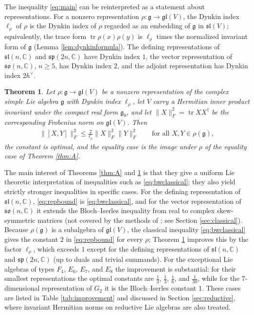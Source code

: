 \documentclass [leqno, 10pt]{amsart}
\newtheorem{theorem}{Theorem}[section]
\theoremstyle{definition}
\numberwithin{equation}{section}
\newcommand{\so}{\mathfrak{so}}
\renewcommand{\sp}{\mathfrak{sp}}
\newcommand{\gl}{\mathfrak{gl}}
\newcommand{\sll}{\mathfrak{sl}}
\newcommand{\g}{\mathfrak{g}}
\newcommand{\com}{\mathbb C}
\newcommand{\tr}{\operatorname{tr}}
\newcommand{\gz}{\g_{0}}
\newcommand{\hv}{h^\vee}
\newcommand{\fnorm}[1]{\lVert #1\rVert_{F}}
\begin{document}
The inequality \eqref{eq:main} can be reinterpreted as a statement about representations. For a nonzero representation $\rho:\g \to \gl(V)$, the Dynkin index $\ell_{\rho}$ of $\rho$ is the Dynkin index of $\rho$ regarded as an embedding of $\g$ in $\sll(V)$; equivalently, the trace form $\tr \rho(x)\rho(y)$ is $\ell_{\rho}$ times the normalized invariant form of $\g$ (Lemma \ref{lem:dynkinformula}). The defining representations of $\sll(n, \com)$ and $\sp(2n, \com)$ have Dynkin index $1$, the vector representation of $\so(n, \com)$, $n \geq 5$, has Dynkin index $2$, and the adjoint representation has Dynkin index $2\hv$.

\begin{theorem}\label{thm:B}
Let $\rho:\g \to \gl(V)$ be a nonzero representation of the complex simple Lie algebra $\g$ with Dynkin index $\ell_{\rho}$, let $V$ carry a Hermitian inner product invariant under the compact real form $\gz$, and let $\fnorm{X}^{2} = \tr XX^{\dagger}$ be the corresponding Frobenius norm on $\gl(V)$. Then
\begin{align}\label{eq:repbound}
\fnorm{[X, Y]}^{2} \leq \frac{2}{\ell_{\rho}}\fnorm{X}^{2}\fnorm{Y}^{2} \qquad \text{for all}\,\, X, Y \in \rho(\g),
\end{align}
the constant is optimal, and the equality case is the image under $\rho$ of the equality case of Theorem \ref{thm:A}.
\end{theorem}

The main interest of Theorems \ref{thm:A} and \ref{thm:B} is that they give a uniform Lie theoretic interpretation of inequalities such as \eqref{eq:bwclassical}; they also yield strictly stronger inequalities in specific cases.
For the defining representation of $\sll(n, \com)$, \eqref{eq:repbound} is \eqref{eq:bwclassical}, and for the vector representation of $\so(n, \com)$ it extends the Bloch--Iserles inequality from real to complex skew-symmetric matrices (not covered by the methods of \cite{Ge-Li-Zhou}; see Section \ref{sec:classical}). Because $\rho(\g)$ is a subalgebra of $\gl(V)$, the classical inequality \eqref{eq:bwclassical} gives the constant $2$ in \eqref{eq:repbound} for every $\rho$; Theorem \ref{thm:B} improves this by the factor $\ell_{\rho}$, which exceeds $1$ except for the defining representations of $\sll(n, \com)$ and $\sp(2n, \com)$ (up to duals and trivial summands). For the exceptional Lie algebras of types $F_{4}$, $E_{6}$, $E_{7}$, and $E_{8}$ the improvement is substantial: for their smallest representations the optimal constants are $\tfrac{1}{3}$, $\tfrac{1}{3}$, $\tfrac{1}{6}$, and $\tfrac{1}{30}$, while for the $7$-dimensional representation of $G_{2}$ it is the Bloch--Iserles constant $1$. These cases are listed in Table \ref{tab:improvement} and discussed in Section \ref{sec:reductive}, where invariant Hermitian norms on reductive Lie algebras are also treated.
\end{document}
